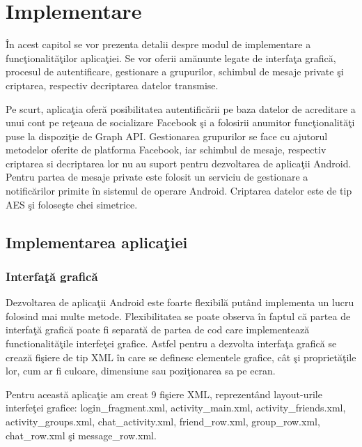 \chapter{Implementare}

\^{I}n acest capitol se vor prezenta detalii despre modul de implementare a func\c{t}ionalit\u{a}\c{t}ilor aplica\c{t}iei. Se vor oferii am\u{a}nunte legate de interfa\c{t}a grafic\u{a}, procesul de autentificare, gestionare a grupurilor, schimbul de mesaje private \c{s}i criptarea, respectiv decriptarea datelor transmise. 

Pe scurt, aplica\c{t}ia ofer\u{a} posibilitatea autentific\u{a}rii pe baza datelor de acreditare a unui cont pe re\c{t}eaua de socializare Facebook \c{s}i a folosirii anumitor func\c{t}ionalit\u{a}\c{t}i puse la dispozi\c{t}ie de Graph API. Gestionarea grupurilor se face cu ajutorul metodelor oferite de platforma Facebook, iar schimbul de mesaje, respectiv criptarea si decriptarea lor nu au suport pentru dezvoltarea de aplica\c{t}ii Android. Pentru partea de mesaje private este folosit un serviciu de gestionare a notific\u{a}rilor primite \^{i}n sistemul de operare Android. Criptarea datelor este de tip AES \c{s}i folose\c{s}te chei simetrice.  

\section{Implementarea aplica\c{t}iei}
\subsection{Interfa\c{t}\u{a} grafic\u{a}}

Dezvoltarea de aplica\c{t}ii Android este foarte flexibil\u{a} put\^{a}nd implementa un lucru folosind mai multe metode. Flexibilitatea se poate observa \^{i}n faptul c\u{a} partea de interfa\c{t}\u{a} grafic\u{a} poate fi separat\u{a} de partea de cod care implementeaz\u{a} functionalit\u{a}\c{t}ile interfe\c{t}ei grafice. Astfel pentru a dezvolta interfa\c{t}a grafic\u{a} se creaz\u{a} fi\c{s}iere de tip XML \^{i}n care se definesc elementele grafice, c\^{a}t \c{s}i propriet\u{a}\c{t}ile lor, cum ar fi culoare, dimensiune sau pozi\c{t}ionarea sa pe ecran.

	Pentru aceast\u{a} aplica\c{t}ie am creat 9 fi\c{s}iere XML, reprezent\^{a}nd layout-urile interfe\c{t}ei grafice: login_fragment.xml, activity_main.xml, activity_friends.xml, activity_groups.xml, chat_activity.xml, friend_row.xml,  group_row.xml, chat_row.xml \c{s}i message_row.xml. 
	
